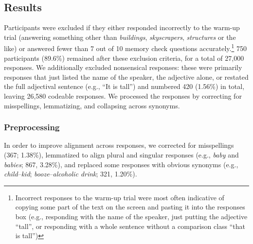 \documentclass[doc]{apa6}
\begin{document}
\subsection{Results}

Participants were excluded if they either responded incorrectly to the warm-up trial (answering something other than \emph{buildings}, \emph{skyscrapers}, \emph{structures} or the like) or answered fewer than 7 out of 10 memory check questions accurately.\footnote{Incorrect responses to the warm-up trial were most often indicative of copying some part of the text on the screen and pasting it into the responses box (e.g., responding with the name of the speaker, just putting the adjective ``tall'', or responding with a whole sentence without a comparison class ``that is tall'')}
750 participants (89.6\%) remained after these exclusion criteria, for a total of 27,000 responses.
We additionally excluded nonsensical responses: these were primarily responses that just listed the name of the speaker, the adjective alone, or restated the full adjectival sentence (e.g., ``It is tall'') and numbered 420 (1.56\%) in total, leaving 26,580 codeable responses. 
We processed the responses by correcting for misspellings, lemmatizing, and collapsing across synonyms. 



\subsubsection{Preprocessing}

In order to improve alignment across responses, we corrected for misspellings (367; 1.38\%), lemmatized to align plural and singular responses (e.g., \emph{baby} and \emph{babies}; 867, 3.28\%), and replaced some responses with obvious synonyms (e.g., \emph{child}--\emph{kid}; \emph{booze}--\emph{alcoholic drink}; 321, 1.20\%). 
\end{document}
